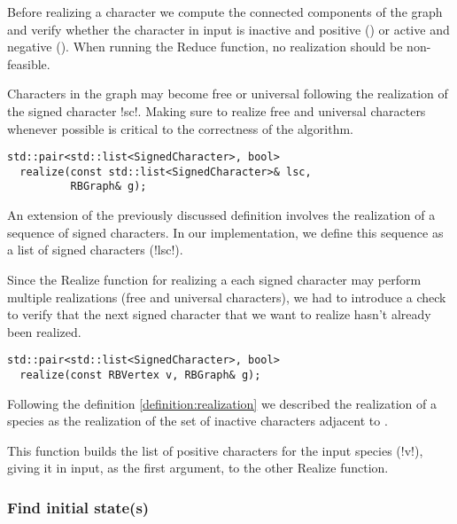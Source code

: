 Before realizing a character we compute the connected components of the graph and verify whether the character in input is inactive and positive (\character[][+]) or active and negative (\character[][-]). When running the Reduce function, no realization should be non-feasible.

Characters in the graph may become free or universal following the realization of the signed character !sc!.
Making sure to realize free and universal characters whenever possible is critical to the correctness of the algorithm.

\text{} %

\begin{lstlisting}[moreemph={RBGraph, SignedCharacter},
                   moreemph={[2]realize}]
  std::pair<std::list<SignedCharacter>, bool>
  realize(const std::list<SignedCharacter>& lsc,
          RBGraph& g);
\end{lstlisting}

An extension of the previously discussed definition involves the realization of a sequence of signed characters. In our implementation, we define this sequence as a list of signed characters \character[][\pm] (!lsc!).

Since the Realize function for realizing a each signed character may perform multiple realizations (free and universal characters), we had to introduce a check to verify that the next signed character that we want to realize hasn't already been realized.

\text{} %

\begin{lstlisting}[moreemph={RBGraph, SignedCharacter, RBVertex},
                   moreemph={[2]realize}]
  std::pair<std::list<SignedCharacter>, bool>
  realize(const RBVertex v, RBGraph& g);
\end{lstlisting}

Following the definition \ref{definition:realization} we described the realization of a species \species[i] as the realization of the set of inactive characters adjacent to \species[i].

This function builds the list of positive characters \character[j][+] for the input species \species[i] (!v!), giving it in input, as the first argument, to the other Realize function.

\subsubsection{Find initial state(s)}\label{section:initial-state}

